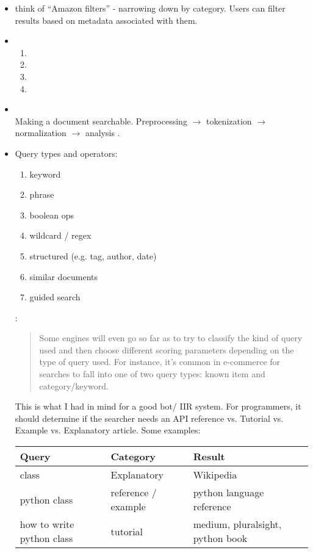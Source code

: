 \documentclass{article}
\begin{document}
\begin{itemize}

\item {} think of ``Amazon filters'' - narrowing down by category.  Users can filter results based on metadata associated with them.

\item {}
    \begin{enumerate}
        \item {}
        \item {}
        \item {}
        \item {}
    \end{enumerate}

\item {} \\
    Making a document searchable. Preprocessing $\to$ tokenization $\to$ normalization  $\to$ analysis .

\item {} Query types and operators: 
    \begin{enumerate}
        \item keyword
        \item phrase
        \item boolean ops
        \item wildcard / regex
        \item structured (e.g. tag, author, date)
        \item similar documents 
        \item guided search 
    \end{enumerate}

    :
    \begin{quote}
        Some engines will even go so far as to try to classify the kind of query used and then choose  different  scoring  parameters  depending  on  the  type  of  query  used.  For instance, it’s common in e-commerce for searches to fall into one of two query types: known item and category/keyword.
    \end{quote}
    
    This is what I had in mind for a good bot/ IIR system.  For programmers, it should determine if the searcher needs an API reference vs. Tutorial vs. Example vs. Explanatory article.  Some examples: \\
    \begin{tabular}{|l|l|l|}
    \hline
    Query & Category & Result \\
    \hline
    class & Explanatory & Wikipedia \\
    python class & reference / example & python language reference \\
    how to write python class & tutorial & medium, pluralsight, python book\\
    \hline
    \end{tabular}


\end{itemize}
\end{document}
